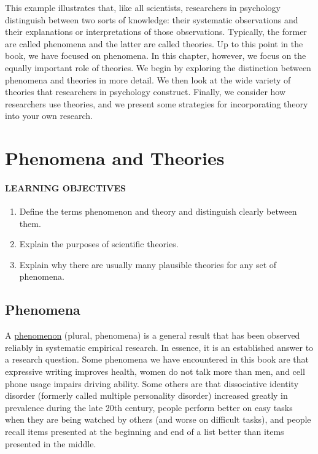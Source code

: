 \documentclass[
]{krantz}
\providecommand{\tightlist}{%
  \setlength{\itemsep}{0pt}\setlength{\parskip}{0pt}}
\begin{document}
This example illustrates that, like all scientists, researchers in psychology distinguish between two sorts of knowledge: their systematic observations and their explanations or interpretations of those observations. Typically, the former are called phenomena and the latter are called theories. Up to this point in the book, we have focused on phenomena. In this chapter, however, we focus on the equally important role of theories. We begin by exploring the distinction between phenomena and theories in more detail. We then look at the wide variety of theories that researchers in psychology construct. Finally, we consider how researchers use theories, and we present some strategies for incorporating theory into your own research.

\section{Phenomena and Theories}\label{phenomena-and-theories}

\paragraph*{LEARNING OBJECTIVES}\label{learning-objectives-27}

\begin{enumerate}
\def\labelenumi{\arabic{enumi}.}
\tightlist
\item
  Define the terms phenomenon and theory and distinguish clearly between them.
\item
  Explain the purposes of scientific theories.
\item
  Explain why there are usually many plausible theories for any set of phenomena.
\end{enumerate}

\subsection*{Phenomena}\label{phenomena}


A \hyperref[phenomenon]{phenomenon} (plural, phenomena) is a general result that has been observed reliably in systematic empirical research. In essence, it is an established answer to a research question. Some phenomena we have encountered in this book are that expressive writing improves health, women do not talk more than men, and cell phone usage impairs driving ability. Some others are that dissociative identity disorder (formerly called multiple personality disorder) increased greatly in prevalence during the late 20th century, people perform better on easy tasks when they are being watched by others (and worse on difficult tasks), and people recall items presented at the beginning and end of a list better than items presented in the middle.
\end{document}
